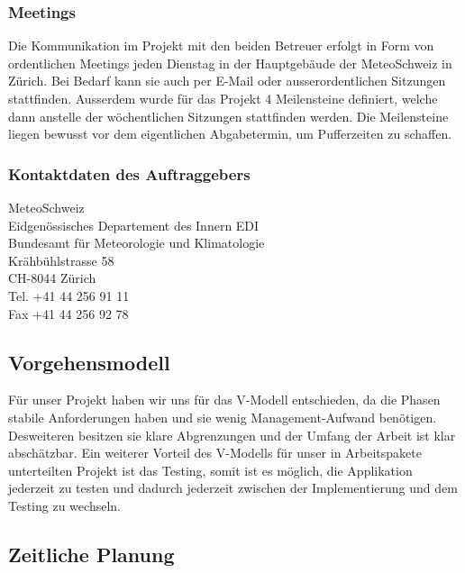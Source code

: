 \documentclass[a4paper,10pt]{article}
\begin{document}
\subsubsection{Meetings}
Die Kommunikation im Projekt mit den beiden Betreuer erfolgt in Form von ordentlichen Meetings jeden Dienstag in der Hauptgebäude der MeteoSchweiz in Zürich. Bei Bedarf kann sie auch per E-Mail oder ausserordentlichen Sitzungen stattfinden. Ausserdem wurde für das Projekt 4 Meilensteine definiert, welche dann anstelle der wöchentlichen Sitzungen stattfinden werden. Die Meilensteine liegen bewusst vor dem eigentlichen Abgabetermin, um Pufferzeiten zu schaffen.

\subsubsection{Kontaktdaten des Auftraggebers}
MeteoSchweiz\\
Eidgenössisches Departement des Innern EDI \\
Bundesamt für Meteorologie und Klimatologie\\
Krähbühlstrasse 58\\
CH-8044 Zürich\\
Tel.   +41 44 256 91 11 \\
Fax   +41 44 256 92 78\\

\subsection{Vorgehensmodell}
Für unser Projekt haben wir uns für das V-Modell entschieden, da die
Phasen stabile Anforderungen haben und sie wenig Management-Aufwand
benötigen. Desweiteren besitzen sie klare Abgrenzungen und der Umfang
der Arbeit ist klar abschätzbar. Ein weiterer Vorteil des V-Modells für unser 
in Arbeitspakete unterteilten Projekt ist das Testing, somit ist es möglich, die 
Applikation jederzeit zu testen und dadurch jederzeit zwischen 
der Implementierung und dem Testing zu wechseln.

\subsection{Zeitliche Planung}
\end{document}
